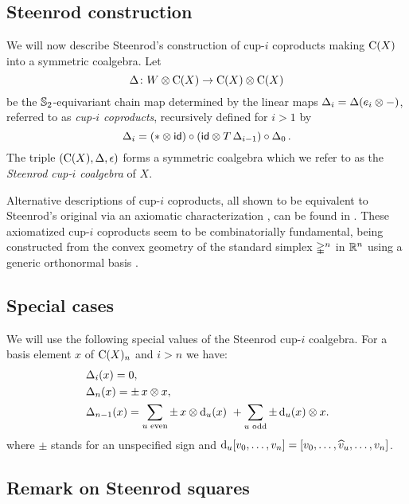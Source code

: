 \subsection{Steenrod construction}\label{ss:cup-i}

We will now describe Steenrod's construction of cup-$i$ coproducts \cite[p.293]{steenrod1947products} making $\operatorname{C}(X)$ into a symmetric coalgebra.
Let
\[
\operatorname{\Delta} \colon W \otimes \operatorname{C}(X) \to \operatorname{C}(X) \otimes \operatorname{C}(X)
\]
be the $\mathbb{S}_2$-equivariant chain map determined by the linear maps $\operatorname{\Delta}_i = \operatorname{\Delta}(e_i \otimes -)$, referred to as \textit{cup-$i$ coproducts}, recursively defined for $i > 1$ by
\begin{equation*}\label{e:cup-i coproducts}
	\operatorname{\Delta}_i =
	(\ast \otimes \mathsf{id}) \circ (\mathsf{id} \otimes T\operatorname{\Delta}_{i-1}) \circ \operatorname{\Delta}_0.
\end{equation*}
The triple $(\operatorname{C}(X), \operatorname{\Delta}, \operatorname{\epsilon})$ forms a symmetric coalgebra which we refer to as the \textit{Steenrod cup-$i$ coalgebra} of $X$.

Alternative descriptions of cup-$i$ coproducts, all shown to be equivalent to Steenrod's original via an axiomatic characterization \cite{medina2022axiomatic}, can be found in \cite{real1996computability, gonzalez-diaz1999steenrod, mcclure2003multivariable, medina2021fast_sq}.
These axiomatized cup-$i$ coproducts seem to be combinatorially fundamental, being constructed from the convex geometry of the standard simplex $\mathbb{\Delta}^n$ in $\mathbb{R}^n$ using a generic orthonormal basis \cite{medina2022fib_poly}.

\subsection{Special cases}\label{ss:special_cases}

We will use the following special values of the Steenrod cup-$i$ coalgebra.
For a basis element $x$ of $\operatorname{C}(X)_n$ and $i > n$ we have:
\begin{align}
	&\operatorname{\Delta}_i(x) = 0, \\
	&\operatorname{\Delta}_n(x) = \pm \, x \otimes x, \\
	&\operatorname{\Delta}_{n-1}(x) =
	\sum_{u \text{ even}} \pm \, x \otimes \operatorname{d}_u(x) \ +
	\sum_{u \text{ odd}} \pm \operatorname{d}_u(x) \otimes x.
\end{align}
where $\pm$ stands for an unspecified sign and $\operatorname{d}_u [v_0,\dots,v_n] = [v_0,\dots,\widehat{v}_u,\dots,v_n]$.

\subsection{Remark on Steenrod squares}\label{ss:steenrod squares}

